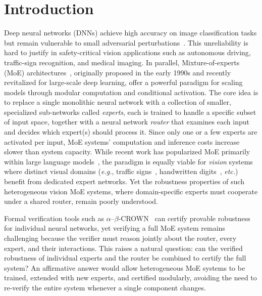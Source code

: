 \documentclass[runningheads]{llncs}
\begin{document}
\section{Introduction}

Deep neural networks (DNNs) achieve high accuracy on image classification tasks but remain vulnerable to small adversarial perturbations~\cite{goodfellow2015,madry2018}. This unreliability is hard to justify in safety-critical vision applications such as autonomous driving, traffic-sign recognition, and medical imaging. In parallel, Mixture-of-experts (MoE) architectures~\cite{jacobs1991,shazeer2017}, originally proposed in the early 1990s and recently revitalized for large-scale deep learning, offer a powerful paradigm for scaling models through modular computation and conditional activation. The core idea is to replace a single monolithic neural network with a collection of smaller, specialized sub-networks called \emph{experts}, each is trained to handle a specific subset of input space, together with a neural network \emph{router} that examines each input and decides which expert(s) should process it. Since only one or a few experts are activated per input, MoE systems' computation and inference costs increase slower than system capacity. While recent work has popularized MoE primarily within large language models~\cite{shazeer2017,deepseek2024}, the paradigm is equally viable for \emph{vision} systems~\cite{riquelme2021} where distinct visual domains (\emph{e.g.}, traffic signs~\cite{gtsrb}, handwritten digits~\cite{mnist1998}, \emph{etc.}) benefit from dedicated expert networks. Yet the robustness properties of such heterogeneous vision MoE systems, where domain-specific experts must cooperate under a shared router, remain poorly understood.

Formal verification tools such as $\alpha$--$\beta$-CROWN~\cite{xu2020abcrown,wang2021} can certify provable robustness for individual neural networks, yet verifying a full MoE system remains challenging because the verifier must reason jointly about the router, every expert, and their interactions. This raises a natural question: can the verified robustness of individual experts and the router be combined to certify the full system? An affirmative answer would allow heterogeneous MoE systems to be trained, extended with new experts, and certified modularly, avoiding the need to re-verify the entire system whenever a single component changes.
\end{document}
